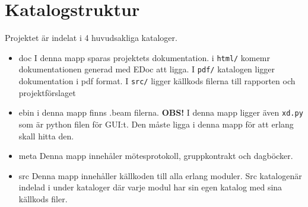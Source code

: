 
\chapter{Katalogstruktur}

\label{Katalogstruktur} 



Projektet är indelat i 4 huvudsakliga kataloger.

\begin{itemize}

\item doc     I denna mapp sparas projektets dokumentation. i \verb+html/+ komemr dokumentationen generad med EDoc att ligga. I \verb+pdf/+ katalogen ligger dokumentation i pdf format. I \verb+src/+ ligger källkods filerna till rapporten och projektförslaget

\item ebin      i denna mapp finns .beam filerna. \textbf{OBS!} I denna mapp ligger även \verb+xd.py+ som är python filen för GUI:t. Den måste ligga i denna mapp för att erlang skall hitta den.

\item meta    Denna mapp innehåler mötesprotokoll, gruppkontrakt och dagböcker.

\item src     Denna mapp innehåller källkoden till alla erlang moduler. Src katalogenär indelad i under kataloger där varje modul har sin egen katalog med sina källkods filer.

\end{itemize}

